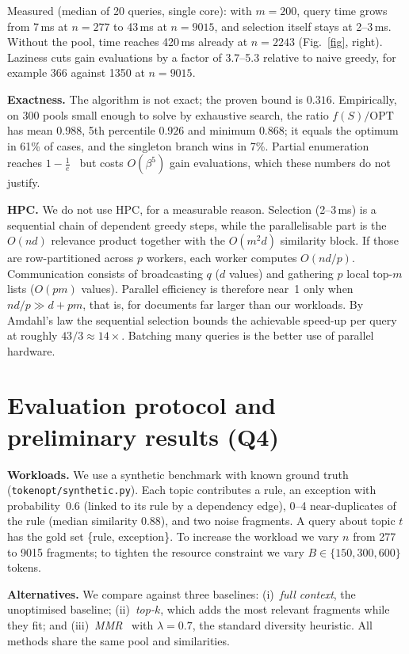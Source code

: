 \documentclass[10pt,a4paper]{article}
\begin{document}
Measured (median of 20 queries, single core): with $m=200$, query time grows from 7\,ms at $n=277$ to 43\,ms at $n=9015$, and selection itself stays at 2--3\,ms. Without the pool, time reaches 420\,ms already at $n=2243$ (Fig.~\ref{fig}, right). Laziness cuts gain evaluations by a factor of 3.7--5.3 relative to naive greedy, for example 366 against 1350 at $n=9015$.

\textbf{Exactness.} The algorithm is not exact; the proven bound is $0.316$. Empirically, on 300 pools small enough to solve by exhaustive search, the ratio $f(S)/\mathrm{OPT}$ has mean $0.988$, 5th percentile $0.926$ and minimum $0.868$; it equals the optimum in 61\% of cases, and the singleton branch wins in 7\%. Partial enumeration reaches $1-\frac1e$~\cite{sviridenko2004} but costs $O(\beta^5)$ gain evaluations, which these numbers do not justify.

\textbf{HPC.} We do not use HPC, for a measurable reason. Selection (2--3\,ms) is a sequential chain of dependent greedy steps, while the parallelisable part is the $O(nd)$ relevance product together with the $O(m^2d)$ similarity block. If those are row-partitioned across $p$ workers, each worker computes $O(nd/p)$. Communication consists of broadcasting $q$ ($d$ values) and gathering $p$ local top-$m$ lists ($O(pm)$ values). Parallel efficiency is therefore near~1 only when $nd/p\gg d+pm$, that is, for documents far larger than our workloads. By Amdahl's law the sequential selection bounds the achievable speed-up per query at roughly $43/3\approx14\times$. Batching many queries is the better use of parallel hardware.

\section{Evaluation protocol and preliminary results (Q4)}

\textbf{Workloads.} We use a synthetic benchmark with known ground truth (\texttt{tokenopt/synthetic.py}). Each topic contributes a rule, an exception with probability~0.6 (linked to its rule by a dependency edge), 0--4 near-duplicates of the rule (median similarity 0.88), and two noise fragments. A query about topic $t$ has the gold set \{rule, exception\}. To increase the workload we vary $n$ from 277 to 9015 fragments; to tighten the resource constraint we vary $B\in\{150,300,600\}$ tokens.

\textbf{Alternatives.} We compare against three baselines: (i)~\emph{full context}, the unoptimised baseline; (ii)~\emph{top-$k$}, which adds the most relevant fragments while they fit; and (iii)~\emph{MMR}~\cite{carbonell1998} with $\lambda=0.7$, the standard diversity heuristic. All methods share the same pool and similarities.
\end{document}
